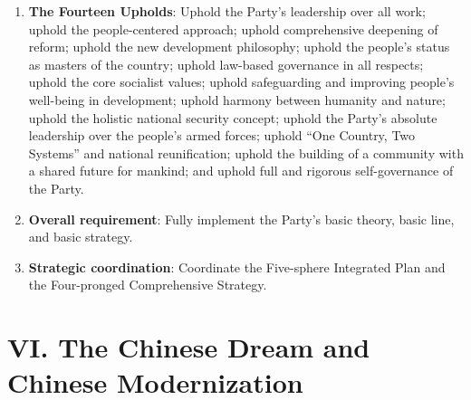 \documentclass[11pt,a4paper]{ctexart}
\begin{document}
\begin{enumerate}[leftmargin=2em]
    \item \textbf{The Fourteen Upholds}: Uphold the Party's leadership over all work; uphold the people-centered approach; uphold comprehensive deepening of reform; uphold the new development philosophy; uphold the people's status as masters of the country; uphold law-based governance in all respects; uphold the core socialist values; uphold safeguarding and improving people's well-being in development; uphold harmony between humanity and nature; uphold the holistic national security concept; uphold the Party's absolute leadership over the people's armed forces; uphold ``One Country, Two Systems'' and national reunification; uphold the building of a community with a shared future for mankind; and uphold full and rigorous self-governance of the Party.
    \item \textbf{Overall requirement}: Fully implement the Party's basic theory, basic line, and basic strategy.
    \item \textbf{Strategic coordination}: Coordinate the Five-sphere Integrated Plan and the Four-pronged Comprehensive Strategy.
\end{enumerate}

\section{VI. The Chinese Dream and Chinese Modernization}
\end{document}
